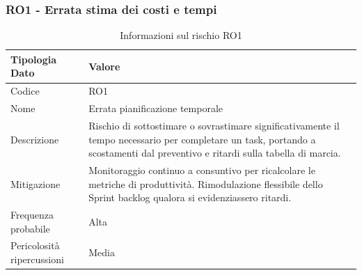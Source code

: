 \documentclass[a4paper,12pt]{article}
\begin{document}
\subsubsection{RO1 - Errata stima dei costi e tempi}
\begin{table}[H]
    \centering
    \renewcommand{\arraystretch}{1.4}
    \begin{tabularx}{\textwidth}{|L|Z|}
        \hline
        \textbf{Tipologia Dato} & \textbf{Valore} \\
        \hline
        Codice & RO1 \\
        \hline
        Nome & Errata pianificazione temporale \\
        \hline
        Descrizione & Rischio di sottostimare o sovrastimare significativamente il tempo necessario per completare un task, portando a scostamenti dal preventivo e ritardi sulla tabella di marcia. \\
        \hline
        Mitigazione & Monitoraggio continuo a consuntivo per ricalcolare le metriche di produttività. Rimodulazione flessibile dello Sprint backlog qualora si evidenziassero ritardi. \\
        \hline
        Frequenza probabile & Alta \\
        \hline
        Pericolosità ripercussioni & Media \\
        \hline
    \end{tabularx}
    \caption{Informazioni sul rischio RO1}
    \label{tab:RO1}
\end{table}
\end{document}

